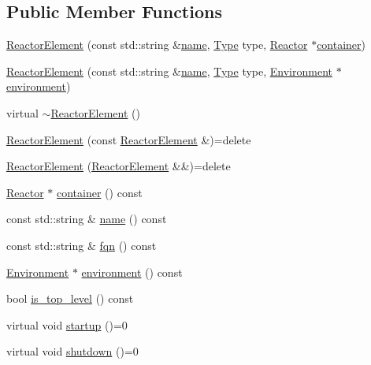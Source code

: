 \subsection*{Public Member Functions}
\begin{DoxyCompactItemize}
\item 
\hyperlink{classreactor_1_1ReactorElement_aebc8c1cabcadca08400284fdb05ce746}{Reactor\+Element} (const std\+::string \&\hyperlink{classreactor_1_1ReactorElement_a99579f61dbaf5d5d98aebfe26eb8bf77}{name}, \hyperlink{classreactor_1_1ReactorElement_a9291659e2893372cfea42ffccfd487b2}{Type} type, \hyperlink{classreactor_1_1Reactor}{Reactor} $\ast$\hyperlink{classreactor_1_1ReactorElement_a25bf298de879a82eefc1ba426be05812}{container})
\item 
\hyperlink{classreactor_1_1ReactorElement_ac5f85a8322de3fad7191a8f749b507fd}{Reactor\+Element} (const std\+::string \&\hyperlink{classreactor_1_1ReactorElement_a99579f61dbaf5d5d98aebfe26eb8bf77}{name}, \hyperlink{classreactor_1_1ReactorElement_a9291659e2893372cfea42ffccfd487b2}{Type} type, \hyperlink{classreactor_1_1Environment}{Environment} $\ast$\hyperlink{classreactor_1_1ReactorElement_a895b09f977450723c59b67b41e643db8}{environment})
\item 
virtual \hyperlink{classreactor_1_1ReactorElement_ac9075040ad83b1945f75f3065c0405fa}{$\sim$\+Reactor\+Element} ()
\item 
\hyperlink{classreactor_1_1ReactorElement_aa975574e21f5f7a4bb761f04ed57dfa4}{Reactor\+Element} (const \hyperlink{classreactor_1_1ReactorElement}{Reactor\+Element} \&)=delete
\item 
\hyperlink{classreactor_1_1ReactorElement_a2ba6e1e309233db7cfc124563f9f8f9f}{Reactor\+Element} (\hyperlink{classreactor_1_1ReactorElement}{Reactor\+Element} \&\&)=delete
\item 
\hyperlink{classreactor_1_1Reactor}{Reactor} $\ast$ \hyperlink{classreactor_1_1ReactorElement_a25bf298de879a82eefc1ba426be05812}{container} () const
\item 
const std\+::string \& \hyperlink{classreactor_1_1ReactorElement_a99579f61dbaf5d5d98aebfe26eb8bf77}{name} () const
\item 
const std\+::string \& \hyperlink{classreactor_1_1ReactorElement_af57b89113cd189208ea95668ad5bd141}{fqn} () const
\item 
\hyperlink{classreactor_1_1Environment}{Environment} $\ast$ \hyperlink{classreactor_1_1ReactorElement_a895b09f977450723c59b67b41e643db8}{environment} () const
\item 
bool \hyperlink{classreactor_1_1ReactorElement_a29c516a59fd1ccc43fa0023c550b6964}{is\+\_\+top\+\_\+level} () const
\item 
virtual void \hyperlink{classreactor_1_1ReactorElement_a8cb574cb20ff963903ad905fb0a157e3}{startup} ()=0
\item 
virtual void \hyperlink{classreactor_1_1ReactorElement_a8fce084bef582156979ebba56737e907}{shutdown} ()=0
\end{DoxyCompactItemize}
